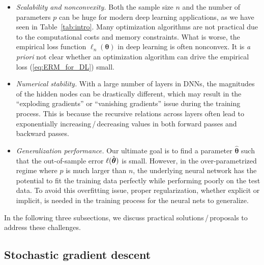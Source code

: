 \begin{itemize}
\item \emph{Scalability and nonconvexity.} Both the sample size $n$ and the number of parameters $p$ can be huge for modern deep learning applications, as we have seen in Table~\ref{tab:intro}.
Many optimization algorithms are not practical due to the computational costs and memory constraints. What is worse, the empirical loss function $\ell_{n}(\bm{\theta})$ in deep learning is often nonconvex. It is \emph{a priori }not clear whether an optimization algorithm can drive the empirical loss (\ref{eq:ERM_for_DL}) small.

\item \emph{Numerical stability.} With a large number of layers in DNNs, the magnitudes of the hidden nodes can be drastically different, which may result in the ``exploding gradients'' or ``vanishing gradients'' issue during the training process. This is because the recursive relations across layers often lead to exponentially increasing$\,$/$\,$decreasing values in both forward passes and backward passes.

\item \emph{Generalization performance.} Our ultimate goal is to find a parameter $\hat {\bm{\theta}}$ such that the out-of-sample error $\ell(\hat {\text{\boldmath $\theta$}})$ is small. %
However, in the over-parametrized regime where $p$ is much larger than $n$, the underlying neural network has the potential to fit the training data perfectly while performing poorly on the test data. To avoid this overfitting issue, proper regularization, whether explicit or implicit, is needed in the training process for the neural nets to generalize.
\end{itemize}

In the following three subsections, we discuss practical solutions$\,$/$\,$proposals to address these challenges.

\subsection{Stochastic gradient descent \label{sec:stochastic-opt}}

